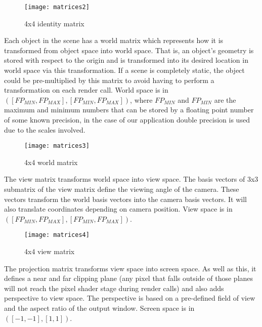 \begin{figure}[!htbp]
  \begin{center}
    \leavevmode
    \ifpdf
      \texttt{[image: matrices2]}
    \fi
    \caption{4x4 identity matrix}
    \label{FigMatrices2}
  \end{center}
\end{figure}

Each object in the scene has a world matrix which represents how it is transformed from object space into world space. 
That is, an object's geometry is stored with respect to the origin and is transformed into its desired location in world space via this transformation. 
If a scene is completely static, the object could be pre-multiplied by this matrix to avoid having to perform a transformation on each render call. World space is in $([FP_{MIN},FP_{MAX}],[FP_{MIN},FP_{MAX}])$,
where $FP_{MIN}$ and $FP_{MIN}$ are the maximum and minimum numbers that can be stored by a floating point number of some known precision, in the case of our application double precision is used due to the scales involved.

\begin{figure}[!htbp]
  \begin{center}
    \leavevmode
    \ifpdf
      \texttt{[image: matrices3]}
    \fi
    \caption{4x4 world matrix}
    \label{FigMatrices3}
  \end{center}
\end{figure}

\pagebreak
The view matrix transforms world space into view space. 
The basis vectors of 3x3 submatrix of the view matrix define the viewing angle of the camera. 
These vectors transform the world basis vectors into the camera basis vectors. It will also translate coordinates depending on camera position. 
View space is in $([FP_{MIN},FP_{MAX}],[FP_{MIN},FP_{MAX}])$.

\begin{figure}[!htbp]
  \begin{center}
    \leavevmode
    \ifpdf
      \texttt{[image: matrices4]}
    \fi
    \caption{4x4 view matrix}
    \label{FigMatrices4}
  \end{center}
\end{figure}

The projection matrix transforms view space into screen space. As well as this, it defines a near and far clipping plane (any pixel that falls outside of those planes will not reach the pixel shader stage during render calls) and also adds perspective to view space. 
The perspective is based on a pre-defined field of view and the aspect ratio of the output window. Screen space is in $([-1,-1],[1,1])$.

